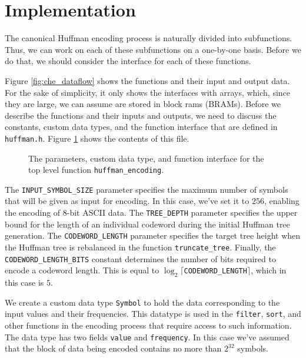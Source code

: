 \section{Implementation}
The canonical Huffman encoding process is naturally divided into subfunctions. Thus, we can work on each of these subfunctions on a one-by-one basis. Before we do that, we should consider the interface for each of these functions. 

Figure \ref{fig:che_dataflow} shows the functions and their input and output data. For the sake of simplicity, it only shows the interfaces with arrays, which, since they are large, we can assume are stored in block rams (BRAMs). Before we describe the functions and their inputs and outputs, we need to discuss the constants, custom data types, and the function interface that are defined in \lstinline{huffman.h}. Figure \ref{fig:huffman_h} shows the contents of this file. 

\begin{figure}

\caption{  The parameters, custom data type, and function interface for the top level function \lstinline{huffman_encoding}.  }
\label{fig:huffman_h}
\end{figure}

The \lstinline{INPUT_SYMBOL_SIZE} parameter specifies the maximum number of symbols that will be given as input for encoding.  In this case, we've set it to $256$, enabling the encoding of 8-bit ASCII data. The \lstinline{TREE_DEPTH} parameter specifies the upper bound for the length of an individual codeword during the initial Huffman tree generation. The \lstinline{CODEWORD_LENGTH} parameter specifies the target tree height when the Huffman tree is rebalanced in the function \lstinline{truncate_tree}. Finally, the \lstinline{CODEWORD_LENGTH_BITS} constant determines the number of bits required to encode a codeword length. This is equal to $\log_2 \lceil $\lstinline{CODEWORD_LENGTH}$\rceil$, which in this case is $5$.

We create a custom data type \lstinline{Symbol} to hold the data corresponding to the input values and their frequencies. This datatype is used in the \lstinline{filter}, \lstinline{sort}, and other functions in the encoding process that require access to such information. The data type has two fields \lstinline{value} and \lstinline{frequency}.  In this case we've assumed that the block of data being encoded contains no more than $2^{32}$ symbols.

